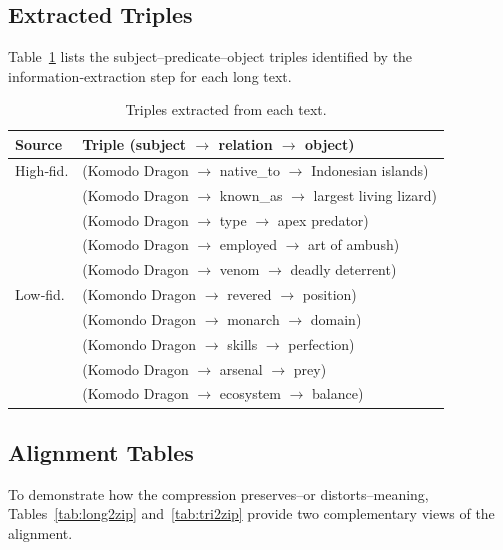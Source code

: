 \documentclass[11pt]{article}
\begin{document}
\subsection{Extracted Triples}
Table~\ref{tab:triples} lists the subject–predicate–object triples
identified by the information‑extraction step for each long text.

\begin{table}[htbp]
  \centering
  \caption{Triples extracted from each text.}
  \label{tab:triples}
  \begin{tabular}{@{}lp{14cm}@{}}
    \toprule
    \textbf{Source} & \textbf{Triple (subject $\to$ relation $\to$ object)} \\
    \midrule
    High‑fid.& (Komodo Dragon $\to$ native\_to $\to$ Indonesian islands) \\
             & (Komodo Dragon $\to$ known\_as $\to$ largest living lizard) \\
             & (Komodo Dragon $\to$ type $\to$ apex predator) \\
             & (Komodo Dragon $\to$ employed $\to$ art of ambush) \\
             & (Komodo Dragon $\to$ venom $\to$ deadly deterrent) \\
    \addlinespace[4pt]
    Low‑fid.& (Komondo Dragon $\to$ revered $\to$ position) \\
             & (Komondo Dragon $\to$ monarch $\to$ domain) \\
             & (Komondo Dragon $\to$ skills $\to$ perfection) \\
             & (Komodo Dragon $\to$ arsenal $\to$ prey) \\
             & (Komodo Dragon $\to$ ecosystem $\to$ balance) \\
    \bottomrule
  \end{tabular}
\end{table}


\subsection{Alignment Tables}
To demonstrate how the compression preserves--or distorts--meaning,
Tables~\ref{tab:long2zip} and~\ref{tab:tri2zip} provide two complementary
views of the alignment.
\end{document}
